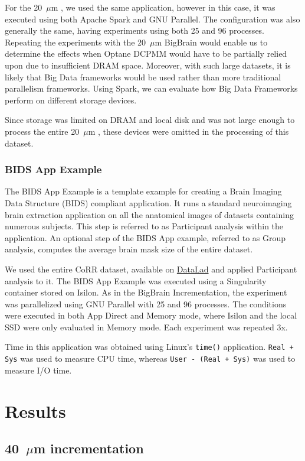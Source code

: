For the 20~$\mu$m \bigbrain, we used the same application, however in this case,
it was executed using both Apache Spark and GNU Parallel. The configuration was
also generally the same, having experiments using both 25 and 96 processes.
Repeating the experiments with the 20~$\mu$m BigBrain would enable us to
determine the effects when Optane DCPMM would have to be partially relied upon
due to insufficient DRAM space. Moreover, with such large datasets, it is likely
that Big Data frameworks would be used rather than more traditional parallelism
frameworks. Using Spark, we can evaluate how Big Data Frameworks perform on
different storage devices.

Since storage was limited on DRAM and local disk and was not large enough to
process the entire 20~$\mu$m \bigbrain, these devices were omitted in the
processing of this dataset. 

\subsubsection{BIDS App Example}

The BIDS App Example is a template example for creating a Brain Imaging Data
Structure (BIDS) compliant application. It runs a standard neuroimaging brain
extraction application on all the anatomical images of datasets containing
numerous subjects. This step is referred to as Participant analysis within the
application. An optional step of the BIDS App example, referred to as Group
analysis, computes the average brain mask size of the entire dataset.

We used the entire CoRR dataset, available on
\href{https://www.datalad.org/}{DataLad} and applied Participant analysis to it.
The BIDS App Example was executed using a Singularity container stored on
Isilon. As in the BigBrain Incrementation, the experiment was parallelized using
GNU Parallel with 25 and 96 processes. The conditions were executed in both App
Direct and Memory mode, where Isilon and the local SSD were only evaluated in
Memory mode. Each experiment was repeated 3x.

Time in this application was obtained using Linux's \texttt{time()} application.
\texttt{Real + Sys} was used to measure CPU time, whereas \texttt{User - (Real +
Sys)} was used to measure I/O time.
\section{Results}

\subsection{40~$\mu$m \bigbrain incrementation}
